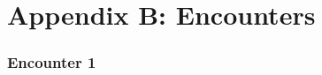 \documentclass[module]{subfiles}
\newcommand{\inittracker}{
	\begin{dndtable}[lXlX]\multicolumn{4}{c}{\textbf{Initiative Tracker}}\\
		30 & & 15 &\\ 29 & & 14 &\\ 28 & & 13 &\\ 27 & & 12 &\\ 26 & & 11 &\\
		25 & & 10 &\\ 24 & & 9 &\\ 23 & & 8 &\\ 22 & & 7 &\\ 21 & & 6 &\\
		20 & & 5 &\\ 19 & & 4 &\\ 18 & & 3 &\\ 17 & & 2 &\\ 16 & & 1 &
	\end{dndtable}}
\begin{document}
\selectfont
\clearpage

\chapter{Appendix B: Encounters}

\begin{comment}

\subsection{Encounter }
\begin{monsterbox}{}
	\textit{}\\
	\hline
	\basics[
		armorclass 	= {},
		hitpoints 	= \dice{},
		speed 		= {30~ft.}]
	\hline
	\stats[
		STR = \stat{},
		DEX = \stat{},
		CON = \stat{},
		INT = \stat{},
		WIS = \stat{},
		CHA = \stat{}]
	\hline
	\details[
		senses = {passive Perception },
		languages = {},
		challenge = {}]
	\hline
	\begin{monsteraction}[]
	
	\end{monsteraction}
	
	\monstersection{Actions}
	\begin{monsteraction}[]
		\textit{Melee Weapon Attack:}
	\end{monsteraction}
\end{monsterbox}
~\\
Monster 1 ( HP):\\~\\
\vfill
\pagebreak
\inittracker

\end{comment}

\subsection{Encounter 1}
\end{document}
